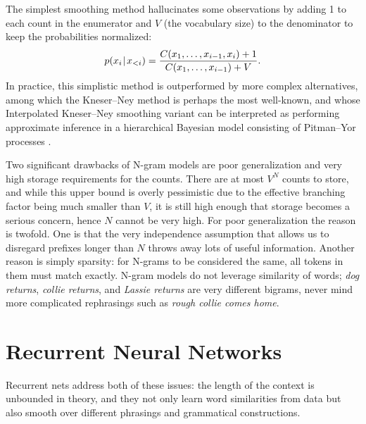 \documentclass[12pt,a4paper,oneside]{book}
\newcommand{\tmid}{\hspace{0.08em}|\hspace{0.11em}}
\begin{document}
The simplest smoothing method hallucinates some observations by adding 1 to each count in the enumerator and $V$ (the vocabulary size) to the denominator to keep the probabilities normalized:
{\def\groundprop{1.6}
\begin{equation*}
p(x_i\tmid x_{<i}) = \frac{C(x_1, \dots, x_{i-1}, x_i)+1}{C(x_1, \dots, x_{i-1})+V}.
\end{equation*}}%
In practice, this simplistic method is outperformed by more complex alternatives, among which the Kneser--Ney method \citep{ney1994structuring} is perhaps the most well-known, and whose Interpolated Kneser--Ney smoothing variant can be interpreted as performing approximate inference in a hierarchical Bayesian model consisting of Pitman--Yor processes \citep{teh2006bayesian}.

Two significant drawbacks of N-gram models are poor generalization and very high storage requirements for the counts.
There are at most $V^N$ counts to store, and while this upper bound is overly pessimistic due to the effective branching factor being much smaller than $V$, it is still high enough that storage becomes a serious concern, hence $N$ cannot be very high.
For poor generalization the reason is twofold.
One is that the very independence assumption that allows us to disregard prefixes longer than $N$ throws away lots of useful information.
Another reason is simply sparsity: for N-grams to be considered the same, all tokens in them must match exactly.
N-gram models do not leverage similarity of words; \emph{dog returns}, \emph{collie returns}, and \emph{Lassie returns} are very different bigrams, never mind more complicated rephrasings such as \emph{rough collie comes home}.

\section{Recurrent Neural Networks}

Recurrent nets address both of these issues: the length of the context is unbounded in theory, and they not only learn word similarities from data but also smooth over different phrasings and grammatical constructions.
\end{document}

